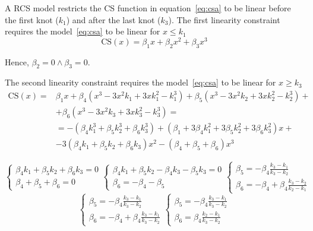 \documentclass[11pt,a4paper,twoside,openany]{book}\usepackage{knitr}
\begin{document}
{\noindent A RCS model restricts the CS function in equation~\ref{eq:csa} to be linear before the first knot ($k_1$) and after the last knot ($k_3$). 
The first linearity constraint requires the model~\ref{eq:csa} to be linear for $x \le k_1$ 
\begin{equation*}
\mathrm{CS}(x) = \beta_1 x + \beta_2x^2 + \beta_3x^3
\label{eq:cs_k1a}
\end{equation*}

\noindent Hence, $\beta_2 = 0 \land \beta_3 = 0$.

\noindent The second linearity constraint requires the model~\ref{eq:csa} to be linear for $x \ge k_3$ 
\begin{align*}
\mathrm{CS}(x) =  & \beta_1 x + \beta_4\left( x^3 - 3x^2k_1 + 3xk_1^2- k_1^3 \right) + \beta_5\left( x^3 - 3x^2k_2 + 3xk_2^2- k_2^3 \right) + \nonumber \\
	&+ \beta_6\left( x^3 - 3x^2k_3 + 3xk_3^2- k_3^3 \right) =  \nonumber \\
	&= - \left(\beta_4k_1^3 + \beta_5k_2^3 + \beta_6k_3^3 \right) + \left( \beta_1 + 3\beta_4k_1^2 + 3\beta_5k_2^2 + 3\beta_6k_3^2\right)x +  \nonumber \\
	&- 3\left( \beta_4k_1 + \beta_5k_2 + \beta_6k_3\right)x^2 - \left( \beta_4 + \beta_5 + \beta_6\right)x^3
\label{eq:cs_k3a}
\end{align*}
 
\begin{equation*}
\begin{cases}\beta_4k_1 + \beta_5k_2 + \beta_6k_3 = 0 \\ 
\beta_4 + \beta_5 + \beta_6 = 0 \end{cases}
\begin{cases}\beta_4k_1 + \beta_5k_2 - \beta_4k_3 - \beta_5 k_3 = 0 \\ 
\beta_6 = -\beta_4 - \beta_5 \end{cases}
\begin{cases}\beta_5 = -\beta_4\frac{k_3 - k_1}{k_3 - k_2} \\ 
\beta_6 = -\beta_4 + \beta_4\frac{k_3 - k_2}{k_2 - k_1} \end{cases}
\end{equation*}
\begin{equation}
\begin{cases}\beta_5 = -\beta_4\frac{k_3 - k_1}{k_3 - k_2} \\ 
\beta_6 = -\beta_4 + \beta_4\frac{k_3 - k_1}{k_3 - k_2} \end{cases}
\begin{cases}\beta_5 = -\beta_4\frac{k_3 - k_1}{k_3 - k_2} \\ 
\beta_6 = \beta_4 \frac{k_2 - k_1}{k_3 - k_2} \end{cases}
\label{eq:systema}
\end{equation}

}
\end{document}
